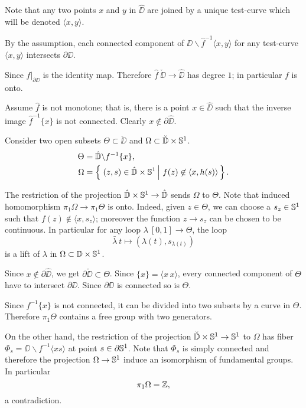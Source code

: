 \documentclass{article}
\begin{document}
Note that any two points $x$ and $y$ in $\hat \DD$ are joined by a unique test-curve which will be denoted $\langle x,y\rangle$.

By the assumption, each connected component of $\DD\backslash \hat f^{-1}\langle x,y\rangle$ for any test-curve $\langle x,y\rangle$ intersects $\partial \hat \DD$.

Since $\hat f|_{\partial\DD}$ is the identity map.
Therefore $\hat f\:\check \DD\to \hat \DD$ has degree $1$;
in particular $f$ is onto.

Assume $\hat f$ is not monotone;
that is, there is a point $x\in \hat\DD$ such that the inverse image $\hat f^{-1}\{x\}$ is not connected.
Clearly $x\notin\partial \hat\DD$.

Consider two open subsets $\Theta\subset\check \DD$ and $\Omega\subset \check {\mathbb{D}}\times\mathbb{S}^1$.
\begin{align*}
\Theta&=\hat \DD\backslash f^{-1}\{x\},
\\
\Omega&=\set{(z,s)\in \hat \DD\times\SS^1}{f(z)\not\in \langle x,h(s)\rangle}.
\end{align*}

The restriction of the projection $\hat {\mathbb{D}}\times\mathbb{S}^1\to \hat {\mathbb{D}}$ sends $\Omega$ to $\Theta$.
Note that induced homomorphism $\pi_1\Omega\to \pi_1\Theta$ is onto.
Indeed, given $z\in \Theta$, we can choose a $s_z\in\mathbb{S}^1$ such that 
$f(z)\notin \langle x,s_z\rangle$;
moreover the function $z\to s_z$ can be chosen to be continuous.
In particular for any loop $\lambda\:[0,1]\to\Theta$, the loop 
\[\bar\lambda\:t\mapsto (\lambda(t),s_{\lambda(t)})\]
is a lift of $\lambda$ in $\Omega\subset \mathbb{D}\times\mathbb{S}^1$.

Since $x\notin\partial \hat \DD$, we get $\partial\check \DD\subset \Theta$.
Since $\{x\}=\langle x\,x\rangle$, every connected component of $\Theta$ have to intersect $\partial\DD$.
Since $\partial\DD$ is connected so is $\Theta$.

Since $f^{-1}\{x\}$ is not connected, it can be divided into two subsets by a curve in $\Theta$.
Therefore $\pi_1\Theta$ contains a free group with two generators.

On the other hand, the restriction of the projection $\check{\mathbb{D}}\times\mathbb{S}^1\to \mathbb{S}^1$ to $\Omega$ has fiber 
$\Phi_s=\DD\backslash f^{-1}\langle xs\rangle$ at point $s\in\partial \mathbb{S}^1$.
Note that $\Phi_s$ is simply connected and therefore the projection $\Omega\to \mathbb{S}^1$ induce an isomorphism of fundamental groups.
In particular 
\[\pi_1\Omega=\mathbb{Z},\]
a contradiction.
\qeds
\end{document}
